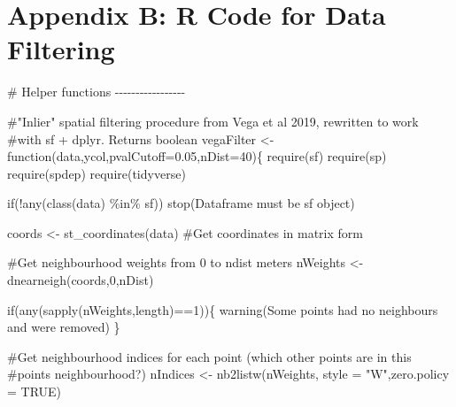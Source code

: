 \documentclass[]{elsarticle} %
\newenvironment{Shaded}{}{}
\newcommand{\AttributeTok}[1]{#1}
\newcommand{\CommentTok}[1]{\textcolor[rgb]{0.00,0.50,0.00}{#1}}
\newcommand{\ConstantTok}[1]{#1}
\newcommand{\ControlFlowTok}[1]{\textcolor[rgb]{0.00,0.00,1.00}{#1}}
\newcommand{\DecValTok}[1]{#1}
\newcommand{\FloatTok}[1]{#1}
\newcommand{\FunctionTok}[1]{#1}
\newcommand{\NormalTok}[1]{#1}
\newcommand{\OtherTok}[1]{\textcolor[rgb]{1.00,0.25,0.00}{#1}}
\newcommand{\SpecialCharTok}[1]{\textcolor[rgb]{0.00,0.50,0.50}{#1}}
\newcommand{\StringTok}[1]{\textcolor[rgb]{0.00,0.50,0.50}{#1}}
\begin{document}
\newpage

\hypertarget{appendix-b-r-code-for-data-filtering}{%
\section*{Appendix B: R Code for Data Filtering}\label{appendix-b-r-code-for-data-filtering}}

\begin{Shaded}
\begin{Highlighting}[]
\CommentTok{\# Helper functions {-}{-}{-}{-}{-}{-}{-}{-}{-}{-}{-}{-}{-}{-}{-}{-}{-}}

\CommentTok{\#"Inlier" spatial filtering procedure from Vega et al 2019, rewritten to work}
\CommentTok{\#with sf + dplyr. Returns boolean}
\NormalTok{vegaFilter }\OtherTok{\textless{}{-}} \ControlFlowTok{function}\NormalTok{(data,ycol,}\AttributeTok{pvalCutoff=}\FloatTok{0.05}\NormalTok{,}\AttributeTok{nDist=}\DecValTok{40}\NormalTok{)\{}
  \FunctionTok{require}\NormalTok{(sf)}
  \FunctionTok{require}\NormalTok{(sp)}
  \FunctionTok{require}\NormalTok{(spdep)}
  \FunctionTok{require}\NormalTok{(tidyverse)}
  
  \ControlFlowTok{if}\NormalTok{(}\SpecialCharTok{!}\FunctionTok{any}\NormalTok{(}\FunctionTok{class}\NormalTok{(data) }\SpecialCharTok{\%in\%} \StringTok{\textquotesingle{}sf\textquotesingle{}}\NormalTok{)) }\FunctionTok{stop}\NormalTok{(}\StringTok{\textquotesingle{}Dataframe must be sf object\textquotesingle{}}\NormalTok{)}
  
\NormalTok{  coords }\OtherTok{\textless{}{-}} \FunctionTok{st\_coordinates}\NormalTok{(data) }\CommentTok{\#Get coordinates in matrix form}
  
  \CommentTok{\#Get neighbourhood weights from 0 to ndist meters}
\NormalTok{  nWeights }\OtherTok{\textless{}{-}} \FunctionTok{dnearneigh}\NormalTok{(coords,}\DecValTok{0}\NormalTok{,nDist) }
  
  \ControlFlowTok{if}\NormalTok{(}\FunctionTok{any}\NormalTok{(}\FunctionTok{sapply}\NormalTok{(nWeights,length)}\SpecialCharTok{==}\DecValTok{1}\NormalTok{))\{}
    \FunctionTok{warning}\NormalTok{(}\StringTok{\textquotesingle{}Some points had no neighbours and were removed\textquotesingle{}}\NormalTok{)}
\NormalTok{  \} }
  
  \CommentTok{\#Get neighbourhood indices for each point (which other points are in this}
  \CommentTok{\#point\textquotesingle{}s neighbourhood?)}
\NormalTok{  nIndices }\OtherTok{\textless{}{-}} \FunctionTok{nb2listw}\NormalTok{(nWeights, }\AttributeTok{style =} \StringTok{"W"}\NormalTok{,}\AttributeTok{zero.policy =} \ConstantTok{TRUE}\NormalTok{) }
  

\end{Highlighting}
\end{Shaded}
\end{document}
